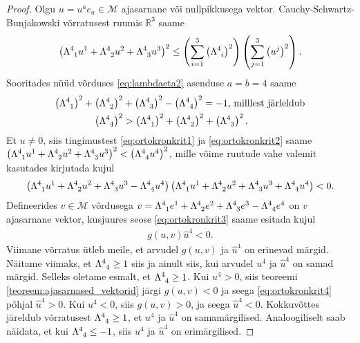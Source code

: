 \documentclass[12pt,a4paper,oneside]{article}
\theoremstyle{plain}
\theoremstyle{definition}
\numberwithin{equation}{section}
\def\R{{\mathbb R}}
\def\M{{\mathcal M}}
\begin{document}
\begin{proof}
Olgu $u = u^a e_a \in \M$ ajasarnane või nullpikkusega vektor. 
Cauchy-Schwartz-Bunjakowski võrratusest ruumis $\R^{3}$ saame
\begin{align} \label{eq:ortokronkrit1}
\left(\Lambda\indices{^4_1} u^1 + \Lambda\indices{^4_2} u^2 + 
\Lambda\indices{^4_3} u^3\right)^2 \leq \left(\sum_{i = 1}^{3} 
\left(\Lambda\indices{^4_i}\right)^2 \right) \left(\sum_{j = 1}^{3} 
\left(u^j\right)^2 \right).
\end{align}
Sooritades nüüd võrduses \ref{eq:lambdaeta2} asenduse $a = b = 4$ 
saame
\begin{align} \label{eq:ortokronkrit2}
\left(\Lambda\indices{^4_1}\right)^2 + 
	\left(\Lambda\indices{^4_2}\right)^2 &+ 
	\left(\Lambda\indices{^4_3}\right)^2 - 
	\left(\Lambda\indices{^4_4}\right)^2 = 
	-1 \text{, milllest järleldub} \nonumber \\
\left(\Lambda\indices{^4_4}\right)^2 &> 
	\left(\Lambda\indices{^4_1}\right)^2 + 
	\left(\Lambda\indices{^4_2}\right)^2 + 
	\left(\Lambda\indices{^4_3}\right)^2.
\end{align}
Et $u \neq 0$, siis tingimustest \ref{eq:ortokronkrit1} ja 
\ref{eq:ortokronkrit2} saame $\left(\Lambda\indices{^4_1} u^1 
+ \Lambda\indices{^4_2} u^2 + \Lambda\indices{^4_3} u^3\right)^2 < 
\left(\Lambda\indices{^4_4} u^4\right)^2$, 
mille võime ruutude vahe valemit kasutades kirjutada kujul
\begin{align} \label{eq:ortokronkrit3}
\left(\Lambda\indices{^4_1} u^1 + \Lambda\indices{^4_2} u^2 + 
\Lambda\indices{^4_3} u^3 - \Lambda\indices{^4_4} u^4\right)
\left(\Lambda\indices{^4_1} u^1 + \Lambda\indices{^4_2} u^2 + 
\Lambda\indices{^4_3} u^3 + \Lambda\indices{^4_4} u^4\right) < 0.
\end{align}
Defineerides $v \in \M$ võrdusega $v = \Lambda\indices{^4_1} e^1 + 
\Lambda\indices{^4_2} e^2 + \Lambda\indices{^4_3} e^3 - 
\Lambda\indices{^4_4} e^4$ on $v$ ajasarnane vektor, kusjuures seose 
\ref{eq:ortokronkrit3} saame esitada kujul
\begin{align} \label{eq:ortokronkrit4}
g\left(u , v\right)\hat{u}^4 < 0.
\end{align}
Viimane võrratus ütleb meile, et arvudel $g\left(u,v\right)$ ja 
$\hat{u}^4$ on erinevad märgid.
Näitame viimaks, et $\Lambda\indices{^4_4} \geq 1$ siis ja ainult 
siis, kui arvudel $u^4$ ja $\hat{u}^4$ on samad märgid.
Selleks oletame esmalt, et $\Lambda\indices{^4_4} \geq 1$. Kui 
$u^4 > 0$, siis teoreemi \ref{teoreem:ajasarnased_vektorid} järgi 
$g\left(u, v\right) < 0$ ja seega \ref{eq:ortokronkrit4} põhjal 
$\hat{u}^4 >0$. Kui $u^4 < 0$, siis $g\left(u, v\right) > 0$, ja 
seega $\hat{u}^4 < 0$. Kokkuvõttes järeldub võrratusest 
$\Lambda\indices{^4_4} \geq 1$, et $u^4$ ja $\hat{u}^4$ on 
samamärgilised. Analoogiliselt saab näidata, et kui 
$\Lambda\indices{^4_4} \leq -1$, siis $u^4$ ja $\hat{u}^4$ on 
erimärgilised.
\end{proof}
\end{document}
